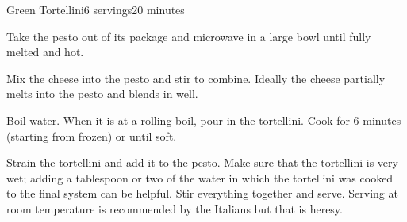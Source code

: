 \documentclass[../Cookbook.tex]{subfiles}
\begin{document}
\begin{recipe}{Green Tortellini}{6 servings}{20 minutes}

	Take the pesto out of its package and microwave in a large bowl until fully melted and hot.

	Mix the cheese into the pesto and stir to combine. Ideally the cheese partially melts into the pesto and blends in well.

	Boil water. When it is at a rolling boil, pour in the tortellini. Cook for 6 minutes (starting from frozen) or until soft.

	Strain the tortellini and add it to the pesto. Make sure that the tortellini is very wet; adding a tablespoon or two of the water in which the tortellini was cooked to the final system can be helpful.
	Stir everything together and serve.
	Serving at room temperature is recommended by the Italians but that is heresy.

\end{recipe}
\end{document}

